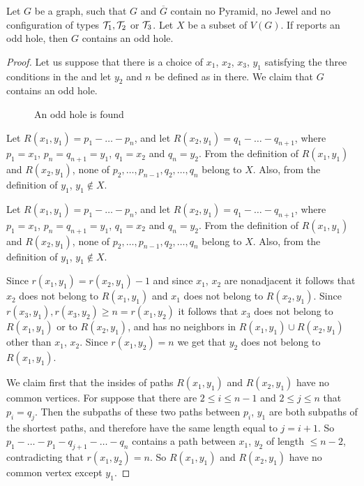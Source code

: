 \begin{theorem}
	Let $G$ be a graph, such that $G$ and $\overline{G}$ contain no Pyramid, no Jewel and no configuration of types $\mathcal{T}_1, \mathcal{T}_2$ or $\mathcal{T}_3$. Let $X$ be a subset of $V(G)$. If  reports an odd hole, then $G$ contains an odd hole.
\end{theorem}
\begin{proof}
	Let us suppose that there is a choice of $x_1$, $x_2$, $x_3$, $y_1$ satisfying the three conditions in the  and let $y_2$ and $n$ be defined as in there. We claim that $G$ contains an odd hole.
	
	{\makeatletter
	\let\par\@@par
	\par{}
	\everypar{}\begin{wrapfigure}{r}{0.35\textwidth}
		
		\caption{An odd hole is found}%
		\vspace{-0.3cm}
		\end{wrapfigure}
		Let $R(x_1, y_1) = p_1-\ldots -p_n$, and let $R(x_2, y_1) = q_1-\ldots -q_{n+1}$, where $p_1 = x_1$, $p_n = q_{n+1} = y_1$, $q_1 = x_2$ and $q_n = y_2$. From the definition of $R(x_1, y_1)$ and $R(x_2, y_1)$, none of $p_2, \ldots, p_{n-1}, q_2, \ldots, q_n$ belong to $X$. Also, from the definition of $y_1$, $y_1 \notin X$.

		Let $R(x_1, y_1) = p_1-\ldots -p_n$, and let $R(x_2, y_1) = q_1-\ldots -q_{n+1}$, where $p_1 = x_1$, $p_n = q_{n+1} = y_1$, $q_1 = x_2$ and $q_n = y_2$. From the definition of $R(x_1, y_1)$ and $R(x_2, y_1)$, none of $p_2, \ldots, p_{n-1}, q_2, \ldots, q_n$ belong to $X$. Also, from the definition of $y_1$, $y_1 \notin X$.

		Since $r(x_1, y_1) = r(x_2, y_1) - 1$ and since $x_1$, $x_2$ are nonadjacent it follows that $x_2$ does not belong to $R(x_1, y_1)$ and $x_1$ does not belong to $R(x_2, y_1)$. Since $r(x_3, y_1), r(x_3, y_2) \geq n = r(x_1, y_2)$ it follows that $x_3$ does not belong to $R(x_1, y_1)$ or to $R(x_2, y_1)$, and has no neighbors in $R(x_1, y_1) \cup R(x_2, y_1)$ other than $x_1$, $x_2$. Since $r(x_1, y_2) = n$ we get that $y_2$ does not belong to $R(x_1, y_1)$.\par}%

	We claim first that the insides of paths $R(x_1, y_1)$ and $R(x_2, y_1)$ have no common vertices. For suppose that there are $2 \leq i \leq n-1$ and $2 \leq j \leq n$ that $p_i = q_j$. Then the subpaths of these two paths between $p_i$, $y_1$ are both subpaths of the shortest paths, and therefore have the same length equal to $j=i+1$. So $p_1-\ldots-p_1-q_{j+1}-\ldots-q_n$ contains a path between $x_1$, $y_2$ of length $\leq n-2$, contradicting that $r(x_1, y_2) = n$. So $R(x_1, y_1)$ and $R(x_2, y_1)$ have no common vertex except $y_1$.


\end{proof}
